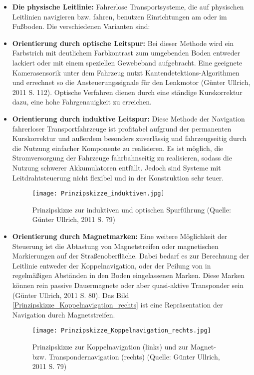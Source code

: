 \begin{itemize}
	\item \textbf{Die physische Leitlinie:}  Fahrerlose Transportsysteme, die auf physischen Leitlinien navigieren bzw. fahren, benutzen Einrichtungen am oder im Fu\ss boden. Die verschiedenen Varianten sind:
 \item \textbf{Orientierung durch optische Leitspur:} Bei dieser Methode wird ein Farbstrich mit deutlichem Farbkontrast zum umgebenden Boden entweder lackiert oder mit einem speziellen Gewebeband aufgebracht.
Eine geeignete Kamerasensorik unter dem Fahrzeug nutzt Kantendetektions-Algorithmen und errechnet so die Ansteuerungssignale f\"ur den Lenkmotor (G\"unter Ullrich, 2011 S. 112).
Optische Verfahren dienen durch eine st\"andige Kurskorrektur dazu, eine hohe Fahrgenauigkeit zu erreichen. 
\item \textbf{Orientierung durch induktive Leitspur:} Diese Methode der Navigation fahrerloser Transportfahrzeuge ist profitabel aufgrund der permanenten Kurskorrektur und au\ss erdem besonders zuverl\"assig und fahrzeugseitig durch die Nutzung einfacher Komponente zu realisieren.
Es ist m\"oglich, die Stromversorgung der Fahrzeuge fahrbahnseitig zu realisieren, sodass die Nutzung schwerer Akkumulatoren entf\"allt.
Jedoch sind Systeme mit Leitdrahtsteuerung nicht flexibel und in der Konstruktion sehr teuer.
\begin{figure}[h!]
	\centering
		\texttt{[image: Prinzipskizze\_induktiven.jpg]}
	\caption{Prinzipskizze zur induktiven und optischen Spurf\"uhrung (Quelle: G\"unter Ullrich, 2011 S. 79)}
	\label{Prinzipskizze_induktiven}
\end{figure}  
	\item \textbf{Orientierung durch Magnetmarken:} Eine weitere M\"oglichkeit der Steuerung ist die Abtastung von Magnetstreifen oder magnetischen Markierungen auf der Straßenoberfl\"ache.
Dabei bedarf es zur Berechnung der Leitlinie entweder der Koppelnavigation, oder der Peilung von in regelm\"a\ss igen Abst\"anden in den Boden eingelassenen Marken.
Diese Marken k\"onnen rein passive Dauermagnete oder aber quasi-aktive Transponder sein (G\"unter Ullrich, 2011 S. 80).
Das Bild \ref{Prinzipskizze_Koppelnavigation_rechts} ist eine Repr\"asentation der Navigation durch Magnetstreifen.
	\begin{figure}[h!]
		\centering
			\texttt{[image: Prinzipskizze\_Koppelnavigation\_rechts.jpg]}
			\caption{Prinzipskizze zur Koppelnavigation (links) und zur Magnet- bzw. Transpondernavigation (rechts) (Quelle: G\"unter Ullrich, 2011 S. 79)}

\end{figure}
\end{itemize}
